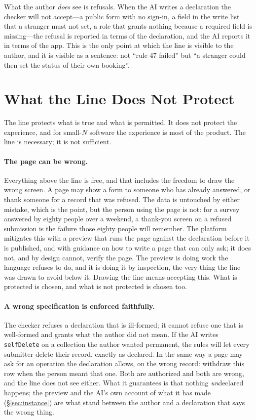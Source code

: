 \documentclass[11pt]{article}
\begin{document}
What the author \emph{does} see is refusals. When the AI writes a declaration the checker will not accept---a public form with no sign-in, a field in the write list that a stranger must not set, a role that grants nothing because a required field is missing---the refusal is reported in terms of the declaration, and the AI reports it in terms of the app. This is the only point at which the line is visible to the author, and it is visible as a sentence: not ``rule 47 failed'' but ``a stranger could then set the status of their own booking''.

\section{What the Line Does Not Protect}
\label{sec:limits}


The line protects what is true and what is permitted. It does not protect the experience, and for small-$N$ software the experience is most of the product. The line is necessary; it is not sufficient.

\paragraph{The page can be wrong.} Everything above the line is free, and that includes the freedom to draw the wrong screen. A page may show a form to someone who has already answered, or thank someone for a record that was refused. The data is untouched by either mistake, which is the point, but the person using the page is not: for a survey answered by eighty people over a weekend, a thank-you screen on a refused submission is the failure those eighty people will remember. The platform mitigates this with a preview that runs the page against the declaration before it is published, and with guidance on how to write a page that can only ask; it does not, and by design cannot, verify the page. The preview is doing work the language refuses to do, and it is doing it by inspection, the very thing the line was drawn to avoid below it. Drawing the line means accepting this. What is protected is chosen, and what is not protected is chosen too.

\paragraph{A wrong specification is enforced faithfully.} The checker refuses a declaration that is ill-formed; it cannot refuse one that is well-formed and grants what the author did not mean. If the AI writes \texttt{selfDelete} on a collection the author wanted permanent, the rules will let every submitter delete their record, exactly as declared. In the same way a page may ask for an operation the declaration allows, on the wrong record: withdraw this row when the person meant that one. Both are authorized and both are wrong, and the line does not see either. What it guarantees is that nothing \emph{un}declared happens; the preview and the AI's own account of what it has made (\S\ref{sec:instance}) are what stand between the author and a declaration that says the wrong thing.
\end{document}
